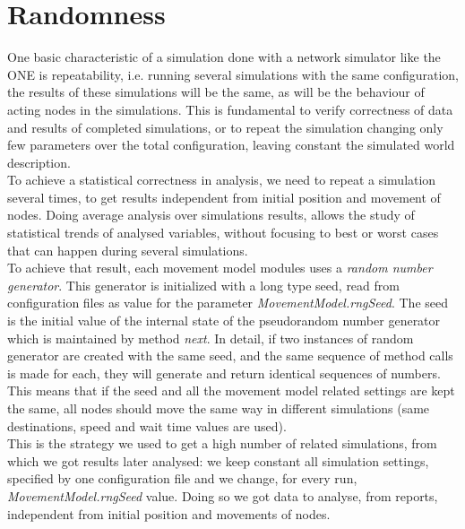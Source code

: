 \section{Randomness}
\label{randomness}
One basic characteristic of a simulation done with a network simulator like the ONE is repeatability, i.e. running several simulations with the same configuration, the results of these simulations will be the same, as will be the behaviour of acting nodes in the simulations. This is fundamental to verify correctness of data and results of completed simulations, or to repeat the simulation changing only few parameters over the total configuration, leaving constant the simulated world description.
\\

To achieve a statistical correctness in analysis, we need to repeat a simulation several times, to get results independent from initial position and movement of nodes. Doing average analysis over simulations results, allows the study of statistical trends of analysed variables, without focusing to best or worst cases that can happen during several simulations. 
\\

To achieve that result, each movement model modules uses a \textit{random number generator}. This generator is initialized with a long type seed, read from configuration files as value for the parameter \textit{MovementModel.rngSeed}. The seed is the initial value of the internal state of the pseudorandom number generator which is maintained by method \textit{next}. In detail, if two instances of random generator are created with the same seed, and the same sequence of method calls is made for each, they will generate and return identical sequences of numbers. This means that if the seed and all the movement model related settings are kept the same, all nodes should move the same way in different simulations (same destinations, speed and wait time values are used).
\\

This is the strategy we used to get a high number of related simulations, from which we got results later analysed: we keep constant all simulation settings, specified by one configuration file and we change, for every run, \textit{MovementModel.rngSeed} value. Doing so we got data to analyse, from reports, independent from initial position and movements of nodes. 


